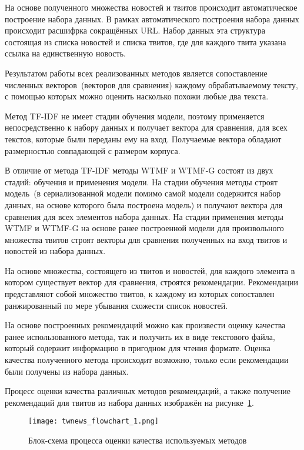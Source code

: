     На основе полученного множества новостей и твитов происходит автоматическое построение набора данных. В рамках автоматического построения набора данных происходит расшифрка сокращённых URL.
    Набор данных эта структура состоящая из списка новостей и списка твитов, где для каждого твита указана ссылка на единственную новость.

    Результатом работы всех реализованных методов является сопоставление численных векторов~(векторов для сравнения) каждому обрабатываемому тексту, с помощью которых можно оценить насколько похожи любые два текста. 

    Метод TF-IDF не имеет стадии обучения модели, поэтому применяется непосредственно к набору данных и получает вектора для сравнения, для всех текстов, которые были переданы ему на вход. Получаемые вектора обладают размерностью совпадающей с размером корпуса.

    В отличие от метода TF-IDF методы WTMF и WTMF-G состоят из двух стадий: обучения и применения модели. На стадии обучения методы строят модель~(в сериализованной модели помимо самой модели содержится набор данных, на основе которого была построена модель) и получают вектора для сравнения для всех элементов набора данных. На стадии применения методы WTMF и WTMF-G на основе ранее построенной модели для произвольного множества твитов строят векторы для сравнения полученных на вход твитов и новостей из набора данных.

    На основе множества, состоящего из твитов и новостей, для каждого элемента в котором существует вектор для сравнения, строятся рекомендации.
    Рекомендации представляют собой множество твитов, к каждому из которых сопоставлен ранжированный по мере убывания схожести список новостей.

    На основе построенных рекомендаций можно как произвести оценку качества ранее использованного метода, так и получить их в виде текстового файла, который содержит информацию в пригодном для чтения формате. Оценка качества полученного метода происходит возможно, только если рекомендации были получены из набора данных.

    Процесс оценки качества различных методов рекомендаций, а также получение рекомендаций для твитов из набора данных изображён на рисунке~\ref{pic:twnews_flowchart_1}.

    \begin{figure}[h!]
            \center
            \texttt{[image: twnews\_flowchart\_1.png]}
            \caption{Блок-схема процесса оценки качества используемых методов}
            \label{pic:twnews_flowchart_1}
    \end{figure}

